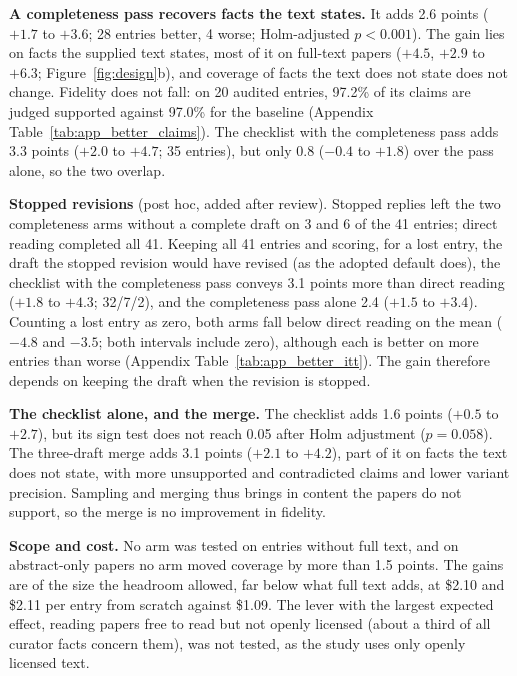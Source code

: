\documentclass{article} %
\begin{document}
\textbf{A completeness pass recovers facts the text states.} It adds 2.6 points ($+1.7$ to $+3.6$; 28 entries better, 4 worse; Holm-adjusted $p<0.001$). The gain lies on facts the supplied text states, most of it on full-text papers ($+4.5$, $+2.9$ to $+6.3$; Figure~\ref{fig:design}b), and coverage of facts the text does not state does not change. Fidelity does not fall: on 20 audited entries, 97.2\% of its claims are judged supported against 97.0\% for the baseline (Appendix Table~\ref{tab:app_better_claims}). The checklist with the completeness pass adds 3.3 points ($+2.0$ to $+4.7$; 35 entries), but only 0.8 ($-0.4$ to $+1.8$) over the pass alone, so the two overlap.

\textbf{Stopped revisions} (post hoc, added after review). Stopped replies left the two completeness arms without a complete draft on 3 and 6 of the 41 entries; direct reading completed all 41. Keeping all 41 entries and scoring, for a lost entry, the draft the stopped revision would have revised (as the adopted default does), the checklist with the completeness pass conveys 3.1 points more than direct reading ($+1.8$ to $+4.3$; 32/7/2), and the completeness pass alone 2.4 ($+1.5$ to $+3.4$). Counting a lost entry as zero, both arms fall below direct reading on the mean ($-4.8$ and $-3.5$; both intervals include zero), although each is better on more entries than worse (Appendix Table~\ref{tab:app_better_itt}). The gain therefore depends on keeping the draft when the revision is stopped.

\textbf{The checklist alone, and the merge.} The checklist adds 1.6 points ($+0.5$ to $+2.7$), but its sign test does not reach 0.05 after Holm adjustment ($p=0.058$). The three-draft merge adds 3.1 points ($+2.1$ to $+4.2$), part of it on facts the text does not state, with more unsupported and contradicted claims and lower variant precision. Sampling and merging thus brings in content the papers do not support, so the merge is no improvement in fidelity.

\textbf{Scope and cost.} No arm was tested on entries without full text, and on abstract-only papers no arm moved coverage by more than 1.5 points. The gains are of the size the headroom allowed, far below what full text adds, at \$2.10 and \$2.11 per entry from scratch against \$1.09. The lever with the largest expected effect, reading papers free to read but not openly licensed (about a third of all curator facts concern them), was not tested, as the study uses only openly licensed text.
\end{document}
